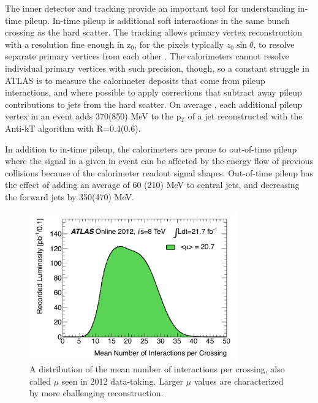 The inner detector and tracking provide an important tool for understanding in-time pileup.  In-time pileup 
is additional soft interactions in the same bunch crossing as the hard scatter.  The tracking allows primary vertex reconstruction 
with a resolution fine enough in z$_0$, for the pixels typically $z_0\sin\theta$, 
to resolve separate primary vertices from each other \cite{pileup_tracks}.   The calorimeters cannot resolve individual primary vertices with such precision, 
though, so a constant struggle in ATLAS is to measure the calorimeter deposits that come from pileup interactions, 
and where possible to apply corrections that subtract away pileup contributions to jets from the hard scatter.  On average
, each additional pileup vertex in an event adds 370(850) \cite{pileup} MeV to the p$_T$ of a jet reconstructed with the Anti-kT algorithm with R=0.4(0.6).

In addition to in-time pileup, the calorimeters are prone to out-of-time pileup where 
the signal in a given in event can be affected by the energy flow of previous collisions because of the 
calorimeter readout signal shapes.  Out-of-time pileup has the effect of adding an average of 60
(210) MeV to central jets, and decreasing the forward jets by 350(470) MeV.  


\begin{figure}
	\includegraphics[width=0.8\textwidth]{ReconstructionPerformance/images/mu_2012-dec.pdf}
	\caption{A distribution of the mean number of interactions per crossing, also called $\mu$ seen in 2012 data-taking.  Larger $\mu$ values are characterized by more challenging reconstruction. 	\label{fig:mu_2012}  }
\end{figure}

